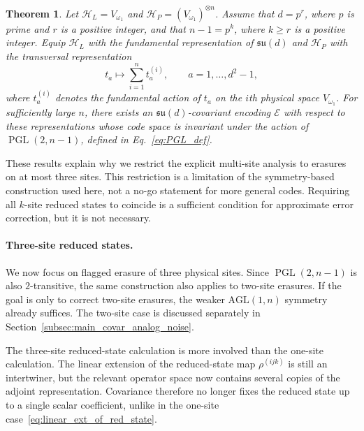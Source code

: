 \documentclass[10pt,twocolumn,superscriptaddress,aps,amsmath,amssymb,citeautoscript,floatfix,prx,longbibliography]{revtex4-2}
\newtheorem{theorem}{Theorem}
\theoremstyle{plain}
\theoremstyle{plain}
\theoremstyle{plain}
\theoremstyle{plain}
\theoremstyle{plain}
\theoremstyle{plain}
\begin{document}
\begin{theorem}\label{thrm:main_3_transitive_covariant_code}
Let $\mathcal H_L=V_{\omega_1}$ and $\mathcal H_P=(V_{\omega_1})^{\otimes n}$. Assume that $d=p^r$, where $p$ is prime and $r$ is a positive integer, and that $n-1=p^k$, where $k\ge r$ is a positive integer. Equip $\mathcal H_L$ with the fundamental representation of $\mathfrak{su}(d)$ and $\mathcal H_P$ with the transversal representation
$$
t_a
\longmapsto
\sum_{i=1}^n t_a^{(i)},
\qquad
a=1,\ldots,d^2-1,
$$
where $t_a^{(i)}$ denotes the fundamental action of $t_a$ on the $i$th physical space $V_{\omega_1}$. For sufficiently large $n$, there exists an $\mathfrak{su}(d)$-covariant encoding $\mathcal E$ with respect to these representations whose code space is invariant under the action of $\operatorname{PGL}(2,n-1)$, defined in Eq.~\eqref{eq:PGL_def}.
\end{theorem}

These results explain why we restrict the explicit multi-site analysis to erasures on at most three sites. This restriction is a limitation of the symmetry-based construction used here, not a no-go statement for more general codes. Requiring all $k$-site reduced states to coincide is a sufficient condition for approximate error correction, but it is not necessary.

\paragraph{Three-site reduced states.}

We now focus on flagged erasure of three physical sites. Since $\operatorname{PGL}(2,n-1)$ is also $2$-transitive, the same construction also applies to two-site erasures. If the goal is only to correct two-site erasures, the weaker $\mathrm{AGL}(1,n)$ symmetry already suffices. The two-site case is discussed separately in Section~\ref{subsec:main_covar_analog_noise}.

The three-site reduced-state calculation is more involved than the one-site calculation. The linear extension of the reduced-state map $\rho^{(ijk)}$ is still an intertwiner, but the relevant operator space now contains several copies of the adjoint representation. Covariance therefore no longer fixes the reduced state up to a single scalar coefficient, unlike in the one-site case~\eqref{eq:linear_ext_of_red_state}.
\end{document}
